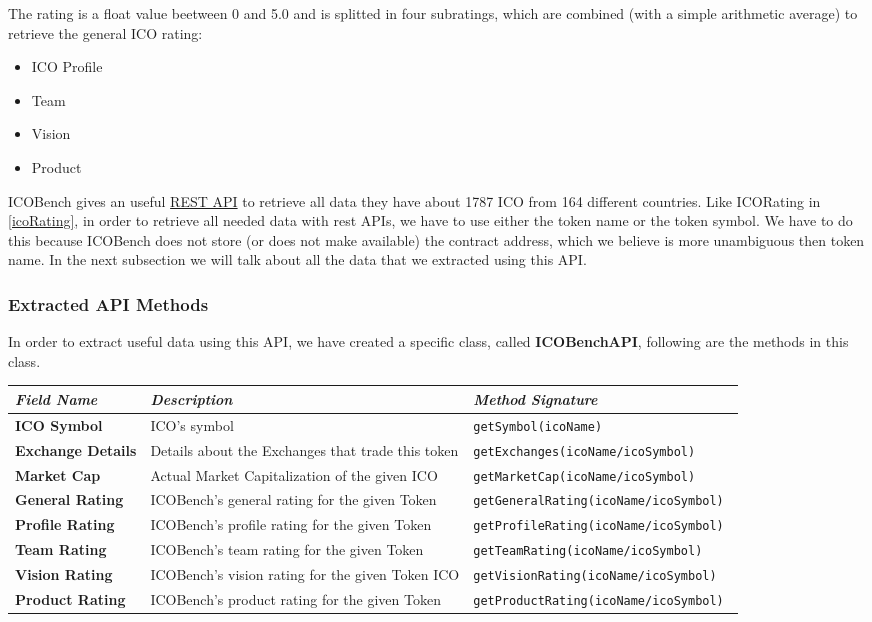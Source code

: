 The rating is a float value beetween 0 and 5.0 and is splitted in four subratings, which are combined (with a simple arithmetic average) to retrieve the general ICO rating:
\begin{itemize}
    \item ICO Profile
    \item Team
    \item Vision
    \item Product
\end{itemize}
ICOBench gives an useful \href{https://icobench.com/developers}{REST API} to retrieve all data they have about 1787 ICO from 164 different countries. \newline
Like ICORating in \ref{icoRating}, in order to retrieve all needed data with rest APIs, we have to use  either the token name or the token symbol. We have to do this because ICOBench does not store (or does not make available) the contract address, which we believe is more unambiguous then token name. \newline
In the next subsection we will talk about all the data that we extracted using this API.
\subsubsection{Extracted API Methods}

In order to extract useful data using this API, we have created a specific class, called \textbf{ICOBenchAPI}, following are the methods in this class.
\begin{center}
\begin{tabular}{| C{2cm} | C{4cm} | C{7cm} |} \hline
    \textit{Field Name} & \textit{Description} & \textit{Method Signature}\\ \hline 
    \textbf{ICO Symbol} & ICO's symbol & \texttt{getSymbol(icoName)}\\ \hline 
    \textbf{Exchange Details} & Details about the Exchanges that trade this token & \texttt{getExchanges(icoName/icoSymbol)}\\ \hline 
    \textbf{Market Cap} & Actual Market Capitalization of the given ICO &
    \texttt{getMarketCap(icoName/icoSymbol)}\\ \hline
    \textbf{General Rating} & ICOBench's general rating for the given Token &
    \texttt{getGeneralRating(icoName/icoSymbol)
    }\\ \hline
    \textbf{Profile Rating} & ICOBench's profile rating for the given Token &
    \texttt{getProfileRating(icoName/icoSymbol)}\\ \hline 
    \textbf{Team Rating} & ICOBench's team rating for the given Token &
    \texttt{getTeamRating(icoName/icoSymbol)}\\ \hline 
    \textbf{Vision Rating} & ICOBench's vision rating for the given Token ICO &
    \texttt{getVisionRating(icoName/icoSymbol)}\\ \hline 
    \textbf{Product Rating} & ICOBench's product rating for the given Token &
    \texttt{getProductRating(icoName/icoSymbol)}\\ \hline
\end{tabular}
\end{center}

